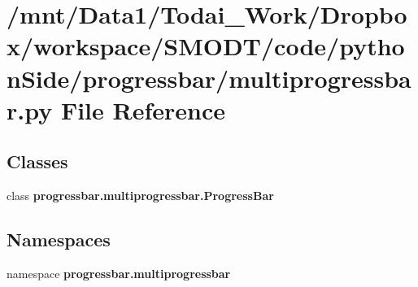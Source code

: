 \section{/mnt/\-Data1/\-Todai\-\_\-\-Work/\-Dropbox/workspace/\-S\-M\-O\-D\-T/code/python\-Side/progressbar/multiprogressbar.py File Reference}
\label{multiprogressbar_8py}
\subsection*{Classes}
\begin{DoxyCompactItemize}
\item 
class {\bf progressbar.\-multiprogressbar.\-Progress\-Bar}
\end{DoxyCompactItemize}
\subsection*{Namespaces}
\begin{DoxyCompactItemize}
\item 
namespace {\bf progressbar.\-multiprogressbar}
\end{DoxyCompactItemize}
